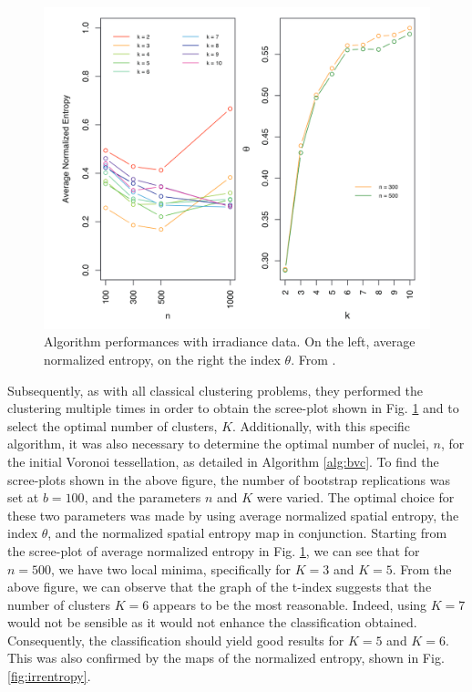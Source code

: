 \begin{figure}[H]
    \centering
    \includegraphics[scale=0.5]{Images/baggingscreeplot.png}
    \caption[Result on irradiance data.]{Algorithm performances with irradiance data. On the left, average normalized entropy, on the right the index $\theta$. From \citeauthor{secchi_bagging_2013} \citeyear{secchi_bagging_2013}.}
    \label{fig:baggingscreeplot}
\end{figure}
Subsequently, as with all classical clustering problems, they performed the clustering multiple times in order to obtain the scree-plot shown in Fig. \ref{fig:baggingscreeplot} and to select the optimal number of clusters, $K$. Additionally, with this specific algorithm, it was also necessary to determine the optimal number of nuclei, $n$, for the initial Voronoi tessellation, as detailed in Algorithm \ref{alg:bvc}. To find the scree-plots shown in the above figure, the number of bootstrap replications was set at $b=100$, and the parameters $n$ and $K$ were varied. The optimal choice for these two parameters was made by using average normalized spatial entropy, the index $\theta$, and the normalized spatial entropy map in conjunction. Starting from the scree-plot of average normalized entropy in Fig. \ref{fig:baggingscreeplot}, we can see that for $n=500$, we have two local minima, specifically for $K=3$ and $K=5$. From the above figure, we can observe that the graph of the t-index suggests that the number of clusters $K=6$ appears to be the most reasonable. Indeed, using $K=7$ would not be sensible as it would not enhance the classification obtained. Consequently, the classification should yield good results for $K=5$ and $K=6$. This was also confirmed by the maps of the normalized entropy, shown in Fig. \ref{fig:irrentropy}.

